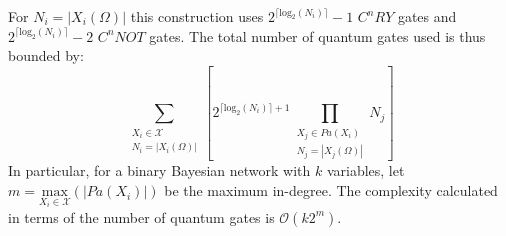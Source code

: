 For $N_i=|X_i(\Omega)|$ this construction uses $2^{\lceil \mathrm{log}_2(N_i) \rceil}-1$ $C^nRY$ gates and $2^{\lceil \mathrm{log}_2(N_i) \rceil}-2$ $C^nNOT$ gates.
The total number of quantum gates used is thus bounded by:
\[\sum_{\substack{X_i \in \mathcal{X} \\ N_i = |X_i(\Omega)|}}
\left[
2^{\lceil \mathrm{log}_2(N_i)\rceil+1} \prod_{\substack{X_j\in Pa(X_i) \\ N_j = |X_j(\Omega)|}}N_j 
\right] 
\]
In particular, for a binary Bayesian network with $k$ variables, let $m = \underset{X_i\in\mathcal{X}}{\mathrm{max}}(|Pa(X_i)|)$ be the maximum in-degree. The complexity calculated in terms of the number of quantum gates is $\mathcal{O}(k2^m)$.
